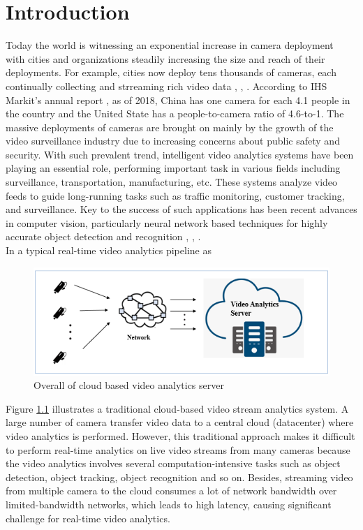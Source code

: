 \chapter{Introduction}  %
Today the world is witnessing an exponential increase in camera deployment ~\citep{ananthanarayanan2019demo} with cities and organizations steadily increasing the size and reach of their deployments. For example, cities now deploy tens thousands of cameras, each continually collecting and strreaming rich video data \cite{ref0}, \cite{ref1}, \cite{ref2}. According to IHS Markit’s annual report \cite{oliverreport}, as of 2018, China has one camera for each 4.1 people in the country and the United State has a people-to-camera ratio of 4.6-to-1. The massive deployments of cameras are brought on mainly by the growth of the video surveillance industry due to increasing concerns about public safety and security. With such prevalent trend, intelligent video analytics systems have been playing an essential role, performing important task in various fields including surveillance, transportation, manufacturing, etc. These systems analyze video feeds to guide long-running tasks such as traffic monitoring, customer tracking, and surveillance. Key to the success of such applications has been recent advances in computer vision, particularly neural network based techniques for highly accurate object detection and recognition \cite{cai2015learning}, \cite{krizhevsky2017imagenet}, \cite{li2015convolutional}.\\
In a typical real-time video analytics pipeline as 
\begin{figure}
\centering
 \includegraphics[width=1.0\linewidth]{Figures/cloud.png}
 \caption{Overall of cloud based video analytics server}
 \label{fig:overall}
\end{figure}
Figure \ref{fig:overall} illustrates a traditional cloud-based video stream analytics system. A large number of camera transfer video data to a central cloud (datacenter) where video analytics is performed. However, this traditional approach makes it difficult to perform real-time analytics on live video streams from many cameras because the video analytics involves several computation-intensive tasks such as object detection, object tracking, object recognition and so on. Besides, streaming video from multiple camera to the cloud consumes a lot of network bandwidth over limited-bandwidth networks, which leads to high latency, causing significant challenge for real-time video analytics.\\
